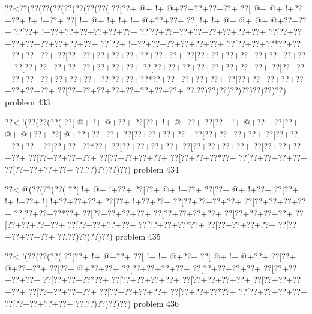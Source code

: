 \vbox{\vbox{\goo
\0??<\0??(\0??(\0??(\0??(\0??(\0??(\0??(\0??(
\0??[\0??+\- @+\- !+\- @+\0??+\0??+\0??+\0??+
\0??[\- @+\- @+\- !+\0??+\0??+\- !+\- !+\0??+
\0??[\- !+\- @+\- !+\- !+\- !+\- @+\0??+\0??+
\0??[\- !+\- !+\- @+\- @+\- @+\- @+\0??+\0??+
\0??[\0??+\- !+\0??+\0??+\0??+\0??+\0??+\0??+
\0??[\0??+\0??+\0??+\0??+\0??+\0??+\0??+\0??+
\0??[\0??+\0??+\0??+\0??+\0??+\0??+\0??+\0??+
\0??[\0??+\- !+\0??+\0??+\0??+\0??+\0??+\0??+
\0??[\0??+\0??+\0??*\0??+\0??+\0??+\0??+\0??+
\0??[\0??+\0??+\0??+\0??+\0??+\0??+\0??+\0??+
\0??[\0??+\0??+\0??+\0??+\0??+\0??+\0??+\0??+
\0??[\0??+\0??+\0??+\0??+\0??+\0??+\0??+\0??+
\0??[\0??+\0??+\0??+\0??+\0??+\0??+\0??+\0??+
\0??[\0??+\0??+\0??+\0??+\0??+\0??+\0??+\0??+
\0??[\0??+\0??+\0??*\0??+\0??+\0??+\0??+\0??+
\0??[\0??+\0??+\0??+\0??+\0??+\0??+\0??+\0??+
\0??[\0??+\0??+\0??+\0??+\0??+\0??+\0??+\0??+
\0??,\0??)\0??)\0??)\0??)\0??)\0??)\0??)\0??)
}
\hfil problem 433\hfil\break
}

\vbox{\vbox{\goo
\0??<\- !(\0??(\0??(\0??(
\0??[\- @+\- !+\- @+\0??+
\0??[\0??+\- !+\- @+\0??+
\0??[\0??+\- !+\- @+\0??+
\0??[\0??+\- @+\- @+\0??+
\0??[\- @+\0??+\0??+\0??+
\0??[\0??+\0??+\0??+\0??+
\0??[\0??+\0??+\0??+\0??+
\0??[\0??+\0??+\0??+\0??+
\0??[\0??+\0??+\0??*\0??+
\0??[\0??+\0??+\0??+\0??+
\0??[\0??+\0??+\0??+\0??+
\0??[\0??+\0??+\0??+\0??+
\0??[\0??+\0??+\0??+\0??+
\0??[\0??+\0??+\0??+\0??+
\0??[\0??+\0??+\0??*\0??+
\0??[\0??+\0??+\0??+\0??+
\0??[\0??+\0??+\0??+\0??+
\0??,\0??)\0??)\0??)\0??)
}
\hfil problem 434\hfil\break
}

\vbox{\vbox{\goo
\0??<\- @(\0??(\0??(\0??(
\0??[\- !+\- @+\- !+\0??+
\0??[\0??+\- @+\- !+\0??+
\0??[\0??+\- @+\- !+\0??+
\0??[\0??+\- !+\- !+\0??+
\- ![\- !+\0??+\0??+\0??+
\0??[\0??+\- !+\0??+\0??+
\0??[\0??+\0??+\0??+\0??+
\0??[\0??+\0??+\0??+\0??+
\0??[\0??+\0??+\0??*\0??+
\0??[\0??+\0??+\0??+\0??+
\0??[\0??+\0??+\0??+\0??+
\0??[\0??+\0??+\0??+\0??+
\0??[\0??+\0??+\0??+\0??+
\0??[\0??+\0??+\0??+\0??+
\0??[\0??+\0??+\0??*\0??+
\0??[\0??+\0??+\0??+\0??+
\0??[\0??+\0??+\0??+\0??+
\0??,\0??)\0??)\0??)\0??)
}
\hfil problem 435\hfil\break
}

\vbox{\vbox{\goo
\0??<\- !(\0??(\0??(\0??(
\0??[\0??+\- !+\- @+\0??+
\0??[\- !+\- !+\- @+\0??+
\0??[\- @+\- !+\- @+\0??+
\0??[\0??+\- @+\0??+\0??+
\0??[\0??+\- @+\0??+\0??+
\0??[\0??+\0??+\0??+\0??+
\0??[\0??+\0??+\0??+\0??+
\0??[\0??+\0??+\0??+\0??+
\0??[\0??+\0??+\0??*\0??+
\0??[\0??+\0??+\0??+\0??+
\0??[\0??+\0??+\0??+\0??+
\0??[\0??+\0??+\0??+\0??+
\0??[\0??+\0??+\0??+\0??+
\0??[\0??+\0??+\0??+\0??+
\0??[\0??+\0??+\0??*\0??+
\0??[\0??+\0??+\0??+\0??+
\0??[\0??+\0??+\0??+\0??+
\0??,\0??)\0??)\0??)\0??)
}
\hfil problem 436\hfil\break
}

